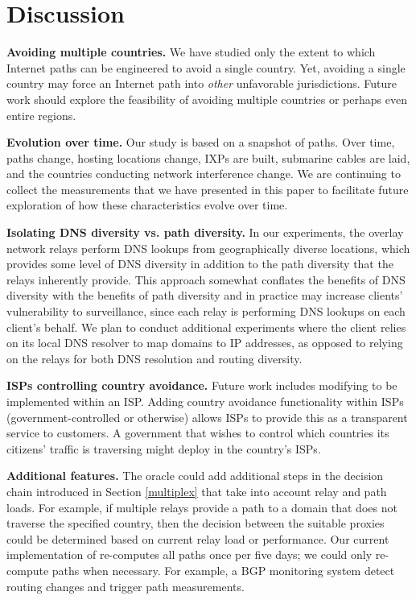 \section{Discussion}
\label{sec:discussion}

{\bf Avoiding multiple countries.} 
We have studied only the extent to which Internet paths can be
engineered to avoid a {single} country.  Yet, avoiding a single country
may force an Internet path into {\em other} unfavorable
jurisdictions. Future work should
explore the feasibility of avoiding multiple countries or perhaps even entire regions.


{\bf Evolution over time.}
Our study is based on a snapshot of paths. Over time, paths
change, hosting locations change, IXPs are built, submarine cables are
laid, and the countries conducting network interference change.  We are continuing to collect
the measurements that we have presented in this paper to facilitate future exploration
of how these characteristics evolve over time.

{\bf Isolating DNS diversity vs. path diversity.}
In our experiments, the overlay network relays perform DNS lookups from
geographically diverse locations, which provides some level of DNS
diversity in addition to the path diversity that the relays inherently
provide. This approach somewhat conflates the benefits of DNS diversity
with the benefits of path diversity and in practice may increase
clients' vulnerability to surveillance, since each relay is performing
DNS lookups on each client's behalf. We plan to conduct additional
experiments where the client relies on its local DNS resolver to map
domains to IP addresses, as opposed to relying on the relays for both
DNS resolution and routing diversity.

{\bf ISPs controlling country avoidance.} 
Future work includes modifying \system{} to be implemented within an 
ISP.  Adding country avoidance functionality within ISPs 
(government-controlled or otherwise) allows ISPs to provide this as a transparent
service to customers.  A government that wishes to control which countries
its citizens' traffic is traversing might deploy \system{} in the country's ISPs.

{\bf Additional \system{} features.}  
The oracle could add additional steps in the decision
chain introduced in Section \ref{multiplex} that take into account
relay and path loads.  For example, if multiple relays provide a path
to a domain that does not traverse the specified country, then the
decision between the suitable proxies could be determined based on
current relay load or performance.  Our current implementation of
\system{} re-computes all paths once per five days; we could only
re-compute paths when necessary.  For example, a BGP monitoring system
detect routing changes and trigger path measurements.

